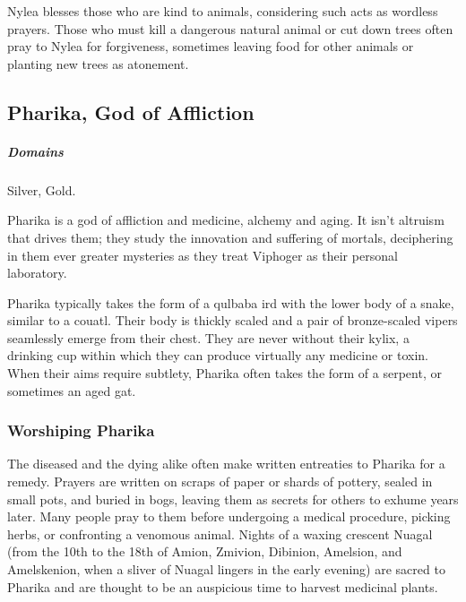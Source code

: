         Nylea blesses those who are kind to animals, considering such acts as wordless prayers.
        Those who must kill a dangerous natural animal or cut down trees often pray to Nylea for forgiveness, sometimes leaving food for other animals or planting new trees as atonement.

\subsection*{Pharika, God of Affliction} \label{ssec::pharika}
    \subparagraph{Domains} Silver, Gold.

    Pharika is a god of affliction and medicine, alchemy and aging.
    It isn't altruism that drives them; they study the innovation and suffering of mortals, deciphering in them ever greater mysteries as they treat Viphoger as their personal laboratory.

    Pharika typically takes the form of a qulbaba ird with the lower body of a snake, similar to a couatl.
    Their body is thickly scaled and a pair of bronze-scaled vipers seamlessly emerge from their chest.
    They are never without their kylix, a drinking cup within which they can produce virtually any medicine or toxin.
    When their aims require subtlety, Pharika often takes the form of a serpent, or sometimes an aged gat.



    \subsubsection{Worshiping Pharika}
        The diseased and the dying alike often make written entreaties to Pharika for a remedy.
        Prayers are written on scraps of paper or shards of pottery, sealed in small pots, and buried in bogs, leaving them as secrets for others to exhume years later.
        Many people pray to them before undergoing a medical procedure, picking herbs, or confronting a venomous animal.
        Nights of a waxing crescent Nuagal (from the 10th to the 18th of Amion, Zmivion, Dibinion, Amelsion, and Amelskenion, when a sliver of Nuagal lingers in the early evening) are sacred to Pharika and are thought to be an auspicious time to harvest medicinal plants.

